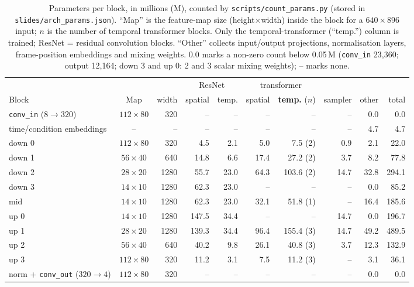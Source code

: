 \documentclass[11pt]{article}
\begin{document}
\begin{table}[tbp]\centering\footnotesize
\setlength{\tabcolsep}{3.2pt}
\caption{Parameters per block, in millions (M), counted by \texttt{scripts/count\_params.py} (stored in \texttt{slides/arch\_params.json}). ``Map'' is the feature-map size (height$\times$width) inside the block for a $640\times896$ input; $n$ is the number of temporal transformer blocks. Only the temporal-transformer (``temp.'') column is trained; ResNet = residual convolution blocks. ``Other'' collects input/output projections, normalisation layers, frame-position embeddings and mixing weights. 0.0 marks a non-zero count below 0.05\,M (\texttt{conv\_in} 23{,}360; output 12{,}164; down 3 and up 0: 2 and 3 scalar mixing weights); -- marks none.}\label{tab:params}
\begin{tabular}{l c r rrrrrr r}\toprule
 & & & \multicolumn{2}{c}{ResNet} & \multicolumn{2}{c}{transformer} & & & \\\cmidrule(lr){4-5}\cmidrule(lr){6-7}
Block & Map & width & spatial & temp. & spatial & \textbf{temp.} ($n$) & sampler & other & total\\\midrule
\texttt{conv\_in} ($8\to320$) & $112\times80$ & 320 & -- & -- & -- & -- & -- & 0.0 & 0.0\\
time/condition embeddings & -- & -- & -- & -- & -- & -- & -- & 4.7 & 4.7\\
down 0 & $112\times80$ & 320 & 4.5 & 2.1 & 5.0 & 7.5 (2) & 0.9 & 2.1 & 22.0\\
down 1 & $56\times40$ & 640 & 14.8 & 6.6 & 17.4 & 27.2 (2) & 3.7 & 8.2 & 77.8\\
down 2 & $28\times20$ & 1280 & 55.7 & 23.0 & 64.3 & 103.6 (2) & 14.7 & 32.8 & 294.1\\
down 3 & $14\times10$ & 1280 & 62.3 & 23.0 & -- & -- & -- & 0.0 & 85.2\\
mid & $14\times10$ & 1280 & 62.3 & 23.0 & 32.1 & 51.8 (1) & -- & 16.4 & 185.6\\
up 0 & $14\times10$ & 1280 & 147.5 & 34.4 & -- & -- & 14.7 & 0.0 & 196.7\\
up 1 & $28\times20$ & 1280 & 139.3 & 34.4 & 96.4 & 155.4 (3) & 14.7 & 49.2 & 489.5\\
up 2 & $56\times40$ & 640 & 40.2 & 9.8 & 26.1 & 40.8 (3) & 3.7 & 12.3 & 132.9\\
up 3 & $112\times80$ & 320 & 11.2 & 3.1 & 7.5 & 11.2 (3) & -- & 3.1 & 36.1\\
norm + \texttt{conv\_out} ($320\to4$) & $112\times80$ & 320 & -- & -- & -- & -- & -- & 0.0 & 0.0\\\midrule

\end{tabular}
\end{table}
\end{document}
